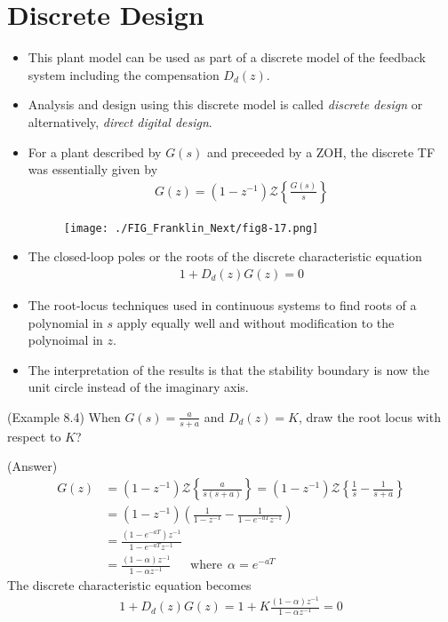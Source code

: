 \documentclass[landscape,14pt]{oblivoir}
\begin{document}
\section{Discrete Design} 
%
\begin{itemize}
	\item This plant model can be used as part of a discrete model of the feedback system including the compensation $D_d(z)$. 
	\item Analysis and design using this discrete model is called \emph{discrete design} or alternatively, \emph{direct digital design}. 
	\item For a plant described by $G(s)$ and preceeded by a ZOH, the discrete TF was essentially given by 
	\begin{align*}
		G(z) = (1-z^{-1}) \mathcal{Z} \left\{ \frac{G(s)}{s} \right\}
	\end{align*}
	\begin{figure}[h]
		\texttt{[image: ./FIG\_Franklin\_Next/fig8-17.png]}
	\end{figure}
	\item The closed-loop poles or the roots of the discrete characteristic equation
	\begin{align*}
		1+ D_d(z) G(z) = 0 
	\end{align*}
	\item The root-locus techniques used in continuous systems to find roots of a polynomial in $s$ apply equally well and without modification to the polynoimal in $z$.
	\item The interpretation of the results is that the stability boundary is now the unit circle instead of the imaginary axis. 
%
\end{itemize}
%

(Example 8.4)  When $G(s) = \frac{a}{s+a}$ and $D_d(z) = K$, draw the root locus with respect to $K$? 

(Answer) 
\begin{align*}
	G(z) &= (1-z^{-1}) \mathcal{Z} \left\{ \frac{a}{s(s+a)} \right\} = (1-z^{-1}) \mathcal{Z} \left\{ \frac{1}{s}  - \frac{1}{s+a} \right\} \\
	&= (1-z^{-1}) \left( \frac{1}{1-z^{-1}} - \frac{1}{1-e^{-aT}z^{-1}} \right)  \\
	&= \frac{(1-e^{-aT})z^{-1}}{1-e^{-aT}z^{-1}} \\
	&= \frac{(1-\alpha)z^{-1}}{1-\alpha z^{-1}} ~~~~~~~\mbox{where}~~ \alpha = e^{-aT}
\end{align*}
The discrete characteristic equation becomes
\begin{align*}
	1+ D_d(z) G(z) = 1 + K\frac{(1-\alpha)z^{-1}}{1-\alpha z^{-1}}= 0 
\end{align*}
\end{document}
